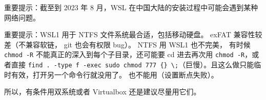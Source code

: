 
\begin{issues}
\issueDraft
\end{issues}

重要提示：截至到 2023 年 8 月，WSL 在中国大陆的安装过程中可能会遇到某种网络问题。

重要提示：WSL1 用于 NTFS 文件系统最合适，包括移动硬盘。 exFAT 兼容性较差（不兼容软链， git 也会有权限 bug）。 NTFS 用 WSL1 也不完美， 有时候 \verb|chmod -R| 不能真正的深入到每个子目录，还可能要 cd 进去再次用 \verb|chmod -R|，或者直接 \verb|find . -type f -exec sudo chmod 777 {} \;|（巨慢）。且这么做只能临时有效，打开另一个命令行就没用了。 也不能用（设置断点失败）。

所以，有条件用双系统或者 Virtualbox 还是建议尽量用它们。

